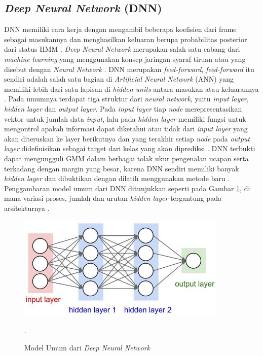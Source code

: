 \subsection{\textit{Deep Neural Network} (DNN)}
\par DNN memiliki cara kerja dengan  mengambil beberapa koefisien dari frame sebagai masukannya dan menghasilkan keluaran berupa probabilitas posterior dari status HMM \citep{hinton2012}. \textit{Deep Neural Network} merupakan salah satu cabang dari \textit{machine learning} yang menggunakan konsep jaringan syaraf tiruan atau yang disebut dengan \textit{Neural Network} \citep{laksono2018}. DNN merupakan \textit{feed-forward}, \textit{feed-forward} itu sendiri adalah salah satu bagian di \textit{Artificial Neural Network} (ANN) yang memiliki lebih dari satu lapisan di \textit{hidden units} antara masukan atau keluarannya \citep{hinton2012}. Pada umumnya terdapat tiga struktur dari \textit{neural network}, yaitu \textit{input layer}, \textit{hidden layer} dan \textit{output layer}. Pada \textit{input layer} tiap \textit{node} merepresentasikan vektor untuk jumlah data \textit{input}, lalu pada \textit{hidden layer} memiliki fungsi untuk mengontrol apakah informasi dapat diketahui atau tidak dari \textit{input layer} yang akan diteruskan ke layer berikutnya dan yang terakhir setiap \textit{node} pada \textit{output layer} didefinisikan sebagai target dari kelas yang akan diprediksi \citep{misbullah2020}. DNN terbukti dapat mengungguli GMM dalam berbagai tolak ukur pengenalan ucapan serta terkadang dengan margin yang besar, karena DNN sendiri memiliki banyak \textit{hidden layer} dan dibuktikan dengan dilatih menggunakan metode baru \citep{hinton2012}. Penggambaran model umum dari DNN ditunjukkan seperti pada Gambar \ref{dnn_arsitektur}, di mana variasi proses, jumlah dan urutan \textit{hidden layer} tergantung pada arsitekturnya \citep{musiol2016}. 

\begin{figure}[H]
\centering
\shadowbox
{\includegraphics [width = 10cm, height= 5cm]{gambar/dnn_arsitektur}}
\caption{Model Umum dari \textit{Deep Neural Network} \citep{musiol2016}}.
\label{dnn_arsitektur}
\end{figure}

